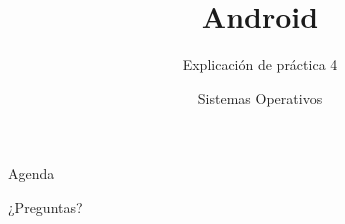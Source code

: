 


\title{Android}
\author{Sistemas Operativos}
\subtitle{Explicación de práctica 4}





\begin{frame}
  \titlepage
\end{frame}

\begin{frame}{Agenda}
  \tableofcontents
\end{frame}




\begin{frame}{}
  \begin{center}
    \vfill
    \huge ¿Preguntas?
    \vfill
  \end{center}
\end{frame}


